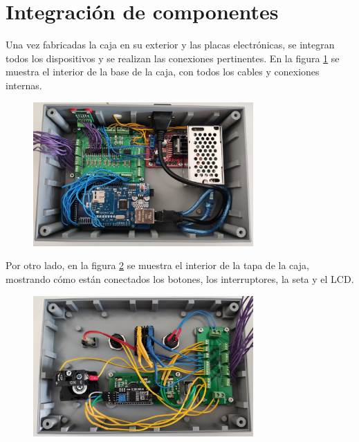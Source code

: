 \section{Integración de componentes}

Una vez fabricadas la caja en su exterior y las placas electrónicas, se integran todos 
los dispositivos y se realizan las conexiones pertinentes. En la figura \ref{fig:cajainterior}
se muestra el interior de la base de la caja, con todos los cables y conexiones internas.

\begin{figure}[hbtp]%
    \centering 
        \includegraphics[width=0.75\textwidth]{07-resultados/cajainterior.jpg}
    \caption{}
    \label{fig:cajainterior} 
\end{figure}

Por otro lado, en la figura \ref{fig:cajatapainterior} se muestra el interior de la tapa de la 
caja, mostrando cómo están conectados los botones, los interruptores, la seta y el LCD.

\begin{figure}[hbtp]
    \centering 
        \includegraphics[width=0.75\textwidth]{07-resultados/cajatapa.jpg}
    \caption{}
    \label{fig:cajatapainterior} 
\end{figure}


